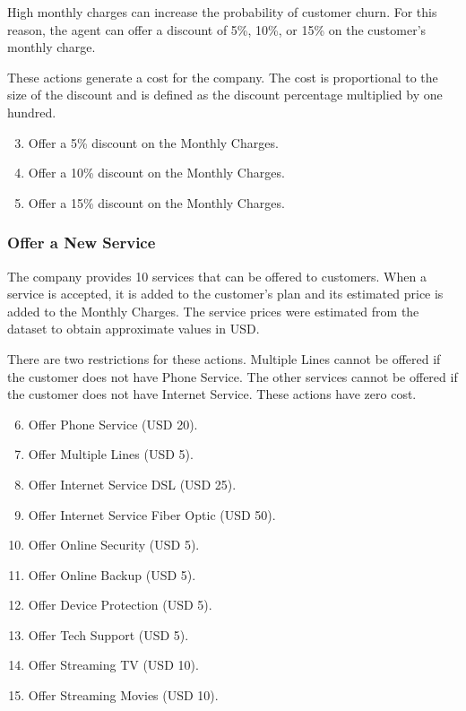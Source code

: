 \documentclass{article}
\begin{document}
High monthly charges can increase the probability of customer churn. For this reason, the agent
can offer a discount of 5\%, 10\%, or 15\% on the customer's monthly charge.

These actions generate a cost for the company. The cost is proportional to the size of the
discount and is defined as the discount percentage multiplied by one hundred.

\begin{enumerate}
\setcounter{enumi}{2}
\item Offer a 5\% discount on the Monthly Charges.
\item Offer a 10\% discount on the Monthly Charges.
\item Offer a 15\% discount on the Monthly Charges.
\end{enumerate}

\subsubsection{Offer a New Service}

The company provides 10 services that can be offered to customers. When a service is accepted,
it is added to the customer's plan and its estimated price is added to the Monthly Charges.
The service prices were estimated from the dataset to obtain approximate values in USD.

There are two restrictions for these actions. Multiple Lines cannot be offered if the customer
does not have Phone Service. The other services cannot be offered if the customer does not have
Internet Service. These actions have zero cost.

\begin{enumerate}
\setcounter{enumi}{5}
\item Offer Phone Service (USD 20).
\item Offer Multiple Lines (USD 5).
\item Offer Internet Service DSL (USD 25).
\item Offer Internet Service Fiber Optic (USD 50).
\item Offer Online Security (USD 5).
\item Offer Online Backup (USD 5).
\item Offer Device Protection (USD 5).
\item Offer Tech Support (USD 5).
\item Offer Streaming TV (USD 10).
\item Offer Streaming Movies (USD 10).
\end{enumerate}
\end{document}
